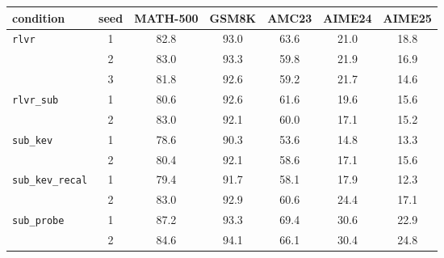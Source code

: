 \begin{tabular}{@{}lcccccc@{}}
\toprule
condition & seed & MATH-500 & GSM8K & AMC23 & AIME24 & AIME25 \\ \midrule
\texttt{rlvr} & 1 & 82.8 & 93.0 & 63.6 & 21.0 & 18.8 \\
 & 2 & 83.0 & 93.3 & 59.8 & 21.9 & 16.9 \\
 & 3 & 81.8 & 92.6 & 59.2 & 21.7 & 14.6 \\
\addlinespace
\texttt{rlvr\_sub} & 1 & 80.6 & 92.6 & 61.6 & 19.6 & 15.6 \\
 & 2 & 83.0 & 92.1 & 60.0 & 17.1 & 15.2 \\
\addlinespace
\texttt{sub\_kev} & 1 & 78.6 & 90.3 & 53.6 & 14.8 & 13.3 \\
 & 2 & 80.4 & 92.1 & 58.6 & 17.1 & 15.6 \\
\addlinespace
\texttt{sub\_kev\_recal} & 1 & 79.4 & 91.7 & 58.1 & 17.9 & 12.3 \\
 & 2 & 83.0 & 92.9 & 60.6 & 24.4 & 17.1 \\
\addlinespace
\texttt{sub\_probe} & 1 & 87.2 & 93.3 & 69.4 & 30.6 & 22.9 \\
 & 2 & 84.6 & 94.1 & 66.1 & 30.4 & 24.8 \\
\bottomrule
\end{tabular}
